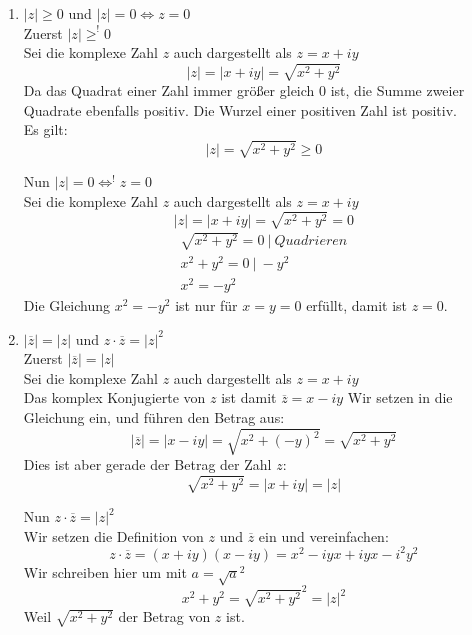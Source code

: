 \documentclass{article}
\begin{document}
\begin{enumerate}[ label = (\alph*) ]
\begin{enumerate}
            \item \( |z| \geq 0 \) und \( |z| = 0 \Leftrightarrow z = 0\) \\
            Zuerst \( |z| \geq^! 0 \) \\
            Sei die komplexe Zahl \(z\) auch dargestellt als \(z = x + iy \) \\
            \[ |z| = | x + iy | = \sqrt{ x^2 + y^2 } \]
            Da das Quadrat einer Zahl immer größer gleich 0 ist, die Summe zweier Quadrate ebenfalls positiv.
            Die Wurzel einer positiven Zahl ist positiv. \\
            Es gilt:
            \[ |z| = \sqrt{ x^2 + y^2 } \geq 0 \]

            Nun \( |z| = 0 \Leftrightarrow^! z = 0\) \\
            Sei die komplexe Zahl \(z\) auch dargestellt als \(z = x + iy \) \\
            \[ |z| = | x + iy | = \sqrt{x^2 + y^2 } = 0 \]
            \begin{gather*}
                \sqrt{x^2 + y^2 } = 0 \ | \ Quadrieren \\
                x^2 + y^2 = 0 \ | \ -y^2 \\
                x^2 = -y^2
            \end{gather*}
            Die Gleichung \( x^2 = -y^2 \) ist nur für \( x=y=0\) erfüllt, damit ist \(z = 0\).

            \item \( |\overline{z}| = |z| \)  und \( z \cdot \overline{z} = {|z|}^2 \) \\
            Zuerst \( |\overline{z}| = |z| \) \\
            Sei die komplexe Zahl \(z\) auch dargestellt als \(z = x + iy \) \\
            Das komplex Konjugierte von \(z\) ist damit \(\overline{z} = x - iy\)
            Wir setzen in die Gleichung ein, und führen den Betrag aus:
            \[ |\overline{z}| = |x - iy| = \sqrt{ x^2 + {(-y)}^2 } = \sqrt{ x^2 + y^2 } \]
            Dies ist aber gerade der Betrag der Zahl \(z\):
            \[ \sqrt{ x^2 + y^2 } = |x + iy| = |z| \]

            Nun \( z \cdot \overline{z} = {|z|}^2 \) \\
            Wir setzen die Definition von \(z\) und \(\overline{z}\) ein und vereinfachen:
            \[ z \cdot \overline{z} = (x + iy) (x -iy) = x^2 - iyx + iyx -i^2y^2 \]
            Wir schreiben hier um mit \( a = {\sqrt{a}}^2 \)
            \[ x^2 + y^2 = {\sqrt{ x^2 + y^2}}^2 = {|z|}^2 \]
            Weil \( \sqrt{x^2 + y^2}\) der Betrag von \(z\) ist.


\end{enumerate}
\end{enumerate}
\end{document}
